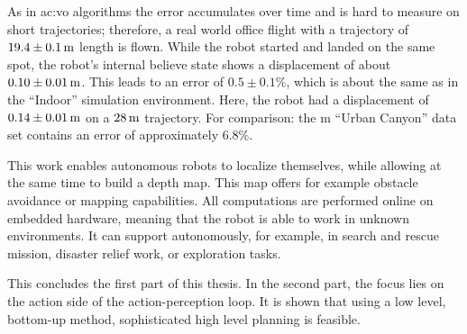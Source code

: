 As in \gls{ac:vo} algorithms the error accumulates over time and is hard to measure on short trajectories; therefore, a real world office flight with a trajectory of $\unit[19.4 \pm 0.1]{m}$ length is flown.
While the robot started and landed on the same spot, the robot's internal believe state shows a displacement of about $\unit[0.10 \pm 0.01]{m}$.
This leads to an error of $0.5\pm 0.1\%$, which is about the same as in the ``Indoor'' simulation environment.
Here, the robot had a displacement of $\unit[0.14\pm 0.01]{m}$ on a $\unit[28]{m}$ trajectory.
For comparison: the \unit[400]{m} ``Urban Canyon'' data set contains an error of approximately $6.8\%$.

This work enables autonomous robots to localize themselves, while allowing at the same time to build a depth map.
This map offers for example obstacle avoidance or mapping capabilities.
All computations are performed online on embedded hardware, meaning that the robot is able to work in unknown environments.
It can support autonomously, for example, in search and rescue mission, disaster relief work, or exploration tasks.

This concludes the first part of this thesis.
In the second part, the focus lies on the action side of the action-perception loop.
It is shown that using a low level, bottom-up method, sophisticated high level planning is feasible.
